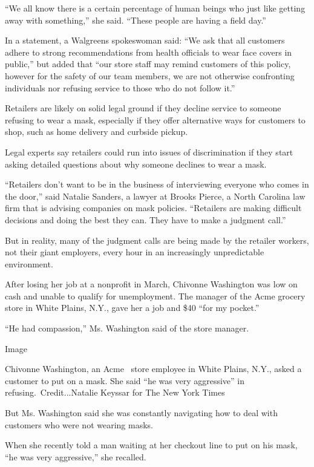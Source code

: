 ``We all know there is a certain percentage of human beings who just
like getting away with something,'' she said. ``These people are having
a field day.''

In a statement, a Walgreens spokeswoman said: ``We ask that all
customers adhere to strong recommendations from health officials to wear
face covers in public,'' but added that ``our store staff may remind
customers of this policy, however for the safety of our team members, we
are not otherwise confronting individuals nor refusing service to those
who do not follow it.''

Retailers are likely on solid legal ground if they decline service to
someone refusing to wear a mask, especially if they offer alternative
ways for customers to shop, such as home delivery and curbside pickup.

Legal experts say retailers could run into issues of discrimination if
they start asking detailed questions about why someone declines to wear
a mask.

``Retailers don't want to be in the business of interviewing everyone
who comes in the door,'' said Natalie Sanders, a lawyer at Brooks
Pierce, a North Carolina law firm that is advising companies on mask
policies. ``Retailers are making difficult decisions and doing the best
they can. They have to make a judgment call.''

But in reality, many of the judgment calls are being made by the
retailer workers, not their giant employers, every hour in an
increasingly unpredictable environment.

After losing her job at a nonprofit in March, Chivonne Washington was
low on cash and unable to qualify for unemployment. The manager of the
Acme grocery store in White Plains, N.Y., gave her a job and \$40 ``for
my pocket.''

``He had compassion,'' Ms. Washington said of the store manager.

Image

Chivonne Washington, an Acme~ store employee in White Plains, N.Y.,
asked a customer to put on a mask. She said ``he was very aggressive''
in refusing.~Credit...Natalie Keyssar for The New York Times

But Ms. Washington said she was constantly navigating how to deal with
customers who were not wearing masks.

When she recently told a man waiting at her checkout line to put on his
mask, ``he was very aggressive,'' she recalled.

